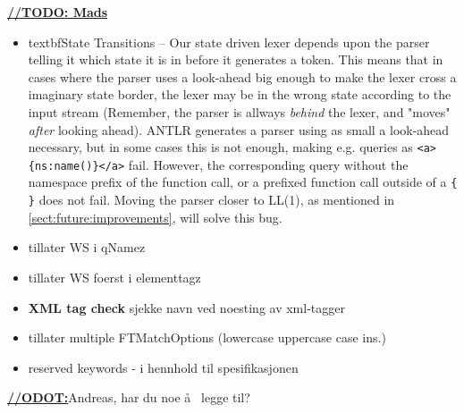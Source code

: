 \underline{\textbf{\LARGE //TODO: Mads}}
\begin{itemize}
\item textbf{State Transitions} -- Our state driven lexer depends upon the parser telling it which state it is in before it generates a token. This means that in cases where the parser uses a look-ahead big enough to make the lexer cross a imaginary state border, the lexer may be in the wrong state according to the input stream (Remember, the parser is allways \emph{behind} the lexer, and "moves" \emph{after} looking ahead). ANTLR generates a parser using as small a look-ahead necessary, but in some cases this is not enough, making e.g. queries as \verb!<a>{ns:name()}</a>! fail. However, the corresponding query without the namespace prefix of the function call, or a prefixed function call outside of a \verb!{ }! does not fail. Moving the parser closer to LL(1), as mentioned in \ref{sect:future:improvements}, will solve this bug.

\item tillater WS i qNamez

\item tillater WS foerst i elementtagz
\item \textbf{XML tag check} sjekke navn ved noesting av xml-tagger
\item tillater multiple FTMatchOptions (lowercase uppercase case ins.)
\item reserved keywords - i hennhold til spesifikasjonen
\end{itemize}

\underline{\textbf{\LARGE //ODOT:}}Andreas, har du noe \aa~ legge til?




